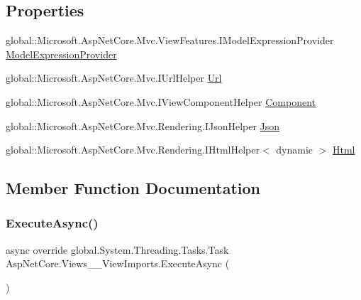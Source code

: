 \subsection*{Properties}
\begin{DoxyCompactItemize}
\item 
global\+::\+Microsoft.\+Asp\+Net\+Core.\+Mvc.\+View\+Features.\+I\+Model\+Expression\+Provider \mbox{\hyperlink{class_asp_net_core_1_1_views_____view_imports_af24a853448780518b9b8bb0494fc03d0}{Model\+Expression\+Provider}}
\item 
global\+::\+Microsoft.\+Asp\+Net\+Core.\+Mvc.\+I\+Url\+Helper \mbox{\hyperlink{class_asp_net_core_1_1_views_____view_imports_af6e6f9f7d99285bd76a2db97f17a9128}{Url}}
\item 
global\+::\+Microsoft.\+Asp\+Net\+Core.\+Mvc.\+I\+View\+Component\+Helper \mbox{\hyperlink{class_asp_net_core_1_1_views_____view_imports_aab0dbba5d923b01ca42fc275a31201e4}{Component}}
\item 
global\+::\+Microsoft.\+Asp\+Net\+Core.\+Mvc.\+Rendering.\+I\+Json\+Helper \mbox{\hyperlink{class_asp_net_core_1_1_views_____view_imports_a5f8b1527e81afa1bcfca3f907e09a406}{Json}}
\item 
global\+::\+Microsoft.\+Asp\+Net\+Core.\+Mvc.\+Rendering.\+I\+Html\+Helper$<$ dynamic $>$ \mbox{\hyperlink{class_asp_net_core_1_1_views_____view_imports_a5de9e15d8a491c339e580feb37748cac}{Html}}
\end{DoxyCompactItemize}


\subsection{Member Function Documentation}
\mbox{\label{class_asp_net_core_1_1_views_____view_imports_afb0fbe4d2cff8ff940fd8555b3f3c64e}} 
\subsubsection{\texorpdfstring{ExecuteAsync()}{ExecuteAsync()}}
{\footnotesize\ttfamily async override global.\+System.\+Threading.\+Tasks.\+Task Asp\+Net\+Core.\+Views\+\_\+\+\_\+\+View\+Imports.\+Execute\+Async (\begin{DoxyParamCaption}{ }\end{DoxyParamCaption})}



